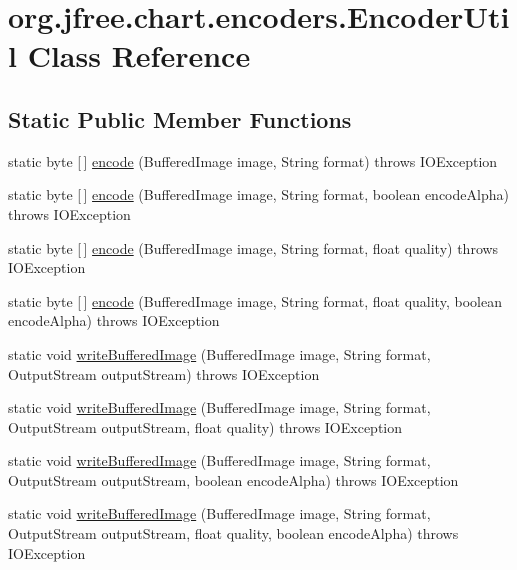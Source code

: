 \hypertarget{classorg_1_1jfree_1_1chart_1_1encoders_1_1_encoder_util}{}\section{org.\+jfree.\+chart.\+encoders.\+Encoder\+Util Class Reference}
\label{classorg_1_1jfree_1_1chart_1_1encoders_1_1_encoder_util}
\subsection*{Static Public Member Functions}
\begin{DoxyCompactItemize}
\item 
static byte \mbox{[}$\,$\mbox{]} \mbox{\hyperlink{classorg_1_1jfree_1_1chart_1_1encoders_1_1_encoder_util_ab62148769acef556ec785dd08e886ae7}{encode}} (Buffered\+Image image, String format)  throws I\+O\+Exception 
\item 
static byte \mbox{[}$\,$\mbox{]} \mbox{\hyperlink{classorg_1_1jfree_1_1chart_1_1encoders_1_1_encoder_util_a74c7ce7c56566304fb11e00cf5a988db}{encode}} (Buffered\+Image image, String format, boolean encode\+Alpha)  throws I\+O\+Exception 
\item 
static byte \mbox{[}$\,$\mbox{]} \mbox{\hyperlink{classorg_1_1jfree_1_1chart_1_1encoders_1_1_encoder_util_ad189d7ff6965d3fd3289e70c63ff43ab}{encode}} (Buffered\+Image image, String format, float quality)  throws I\+O\+Exception 
\item 
static byte \mbox{[}$\,$\mbox{]} \mbox{\hyperlink{classorg_1_1jfree_1_1chart_1_1encoders_1_1_encoder_util_a0468e3e81b1c1134228a4c6f923d1090}{encode}} (Buffered\+Image image, String format, float quality, boolean encode\+Alpha)  throws I\+O\+Exception 
\item 
static void \mbox{\hyperlink{classorg_1_1jfree_1_1chart_1_1encoders_1_1_encoder_util_aa607c49b1c0dc5dde458c241b7b3067a}{write\+Buffered\+Image}} (Buffered\+Image image, String format, Output\+Stream output\+Stream)  throws I\+O\+Exception 
\item 
static void \mbox{\hyperlink{classorg_1_1jfree_1_1chart_1_1encoders_1_1_encoder_util_a566e83a07fe380bae8dd098d54c70033}{write\+Buffered\+Image}} (Buffered\+Image image, String format, Output\+Stream output\+Stream, float quality)  throws I\+O\+Exception 
\item 
static void \mbox{\hyperlink{classorg_1_1jfree_1_1chart_1_1encoders_1_1_encoder_util_ae917483b87ebd02607952f969bd949c4}{write\+Buffered\+Image}} (Buffered\+Image image, String format, Output\+Stream output\+Stream, boolean encode\+Alpha)  throws I\+O\+Exception 
\item 
static void \mbox{\hyperlink{classorg_1_1jfree_1_1chart_1_1encoders_1_1_encoder_util_a29346a4a16937f3ed31e7a3fdc682f67}{write\+Buffered\+Image}} (Buffered\+Image image, String format, Output\+Stream output\+Stream, float quality, boolean encode\+Alpha)  throws I\+O\+Exception 
\end{DoxyCompactItemize}


